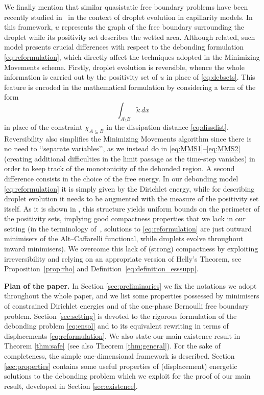 \documentclass[a4paper,11pt,reqno]{amsart}
\numberwithin{equation}{section}
\theoremstyle{definition}
\theoremstyle{remark}
\begin{document}
We finally mention that similar quasistatic free boundary problems have been recently studied in~\cite{CollinsFeld, FeldKimPoz2, FeldKimPoz} in the context of droplet evolution in capillarity models. In this framework, $u$ represents the graph of the free boundary surrounding the droplet while its positivity set describes the wetted area. Although related, such model presents crucial differences with respect to the debonding formulation \eqref{eq:reformulation}, which directly affect the techniques adopted in the Minimizing Movements scheme. Firstly, droplet evolution is reversible, whence the whole information is carried out by the positivity set of $u$  in place of \eqref{eq:debsets}. This feature is encoded in the mathematical formulation by considering a term of the form 
\begin{equation}
    \int_{A\setminus B}\widetilde\kappa \, dx
\end{equation}
in place of the constraint $\chi_{A\subseteq B}$ in the dissipation distance \eqref{eq:dissdist}. Reversibility also simplifies the Minimizing Movements algorithm since there is no need to \lq\lq separate variables\rq\rq, as we instead do in \eqref{eq:MMS1}--\eqref{eq:MMS2} (creating additional difficulties in the limit passage as the time-step vanishes) in order to keep track of the monotonicity of the debonded region. A second difference consists in the choice of the free energy. In our debonding model \eqref{eq:reformulation} it is simply given by the Dirichlet energy, while for describing droplet evolution it needs to be augmented with the measure of the positivity set itself. As it is shown in \cite{FeldKimPoz}, this structure yields uniform bounds on the perimeter of the positivity sets, implying good compactness properties that we lack in our setting (in the terminology of~\cite{Velichkov}, solutions to \eqref{eq:reformulation} are just outward minimisers of the Alt--Caffarelli functional, while droplets evolve throughout inward minimisers). We overcome this lack of (strong) compactness by exploiting irreversibility and relying on an appropriate version of Helly's Theorem, see Proposition~\ref{prop:rho} and Definition~\eqref{eq:definition_esssupp}.

\medskip
	
\noindent\textbf{Plan of the paper.} In Section \ref{sec:preliminaries} we fix the notations we adopt throughout the whole paper, and we list some properties possessed by minimisers of constrained Dirichlet energies and of the one-phase Bernoulli free boundary problem. Section \ref{sec:setting} is devoted to the rigorous formulation of the debonding problem \eqref{eq:ensol} and to its equivalent rewriting in terms of displacements \eqref{eq:reformulation}. We also state our main existence result in Theorem \ref{thm:safe} (see also Theorem \ref{thm:general}). For the sake of completeness, the simple one-dimensional framework is described. Section \ref{sec:properties} contains some useful properties of (displacement) energetic solutions to the debonding problem which we exploit for the proof of our main result, developed in Section \ref{sec:existence}.
\end{document}
